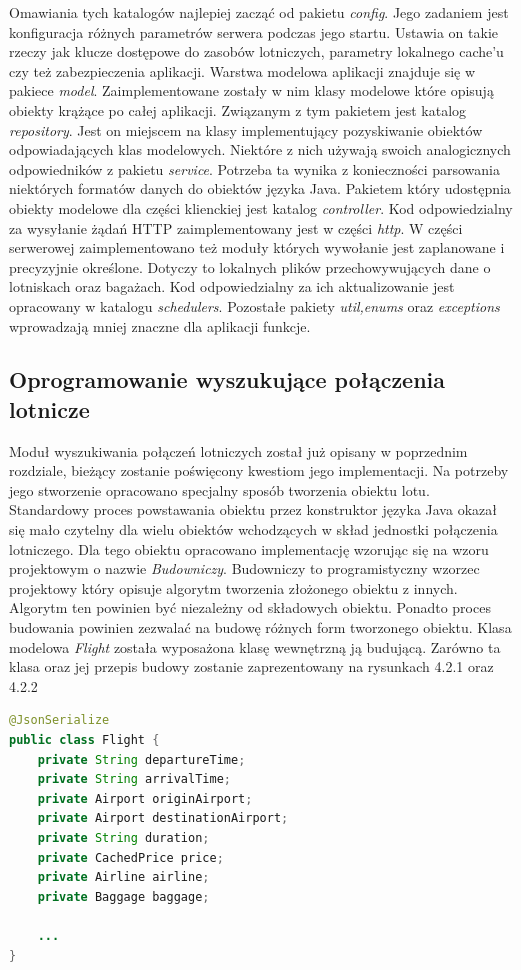 \documentclass[12pt, twoside]{report}
\begin{document}
Omawiania tych katalogów najlepiej zacząć od pakietu \textit{config}. Jego zadaniem jest konfiguracja różnych parametrów serwera podczas jego startu. Ustawia on takie rzeczy jak klucze dostępowe do zasobów lotniczych, parametry lokalnego cache'u czy też zabezpieczenia aplikacji. Warstwa modelowa aplikacji znajduje się w pakiece \textit{model}. Zaimplementowane zostały w nim klasy modelowe które opisują obiekty krążące po całej aplikacji. Związanym z tym pakietem jest katalog \textit{repository}. Jest on miejscem na klasy implementujący pozyskiwanie obiektów odpowiadających klas modelowych. Niektóre z nich używają swoich analogicznych odpowiedników z pakietu \textit{service}. Potrzeba ta wynika z konieczności parsowania niektórych formatów danych do obiektów języka Java. Pakietem który udostępnia obiekty modelowe dla części klienckiej jest katalog \textit{controller}. Kod odpowiedzialny za wysyłanie żądań HTTP zaimplementowany jest w części \textit{http}. W części serwerowej zaimplementowano też moduły których wywołanie jest zaplanowane i precyzyjnie określone. Dotyczy to lokalnych plików przechowywujących dane o lotniskach oraz bagażach. Kod odpowiedzialny za ich aktualizowanie jest opracowany w katalogu \textit{schedulers}. Pozostałe pakiety \textit{util,enums} oraz \textit{exceptions} wprowadzają mniej znaczne dla aplikacji funkcje.  

\subsection{Oprogramowanie wyszukujące połączenia lotnicze}
Moduł wyszukiwania połączeń lotniczych został już opisany w poprzednim rozdziale, bieżący zostanie poświęcony kwestiom jego implementacji. Na potrzeby jego stworzenie opracowano specjalny sposób tworzenia obiektu lotu. Standardowy proces powstawania obiektu przez konstruktor języka Java okazał się mało czytelny dla wielu obiektów wchodzących w skład jednostki połączenia lotniczego. Dla tego obiektu opracowano implementację wzorując się na wzoru projektowym o nazwie \textit{Budowniczy}. Budowniczy to programistyczny wzorzec projektowy który opisuje algorytm tworzenia złożonego obiektu z innych. Algorytm ten powinien być niezależny od składowych obiektu. Ponadto proces budowania powinien zezwalać na budowę różnych form tworzonego obiektu.\cite{builder}
Klasa modelowa \textit{Flight} została wyposażona klasę wewnętrzną ją budującą. Zarówno ta klasa oraz jej przepis budowy zostanie zaprezentowany na rysunkach 4.2.1 oraz 4.2.2
\begin{lstlisting}[language=java, caption=Fragment klasy Flight]
@JsonSerialize
public class Flight {
    private String departureTime;
    private String arrivalTime;
    private Airport originAirport;
    private Airport destinationAirport;
    private String duration;
    private CachedPrice price;
    private Airline airline;
    private Baggage baggage;
    
    ...
}
\end{lstlisting}
\end{document}
